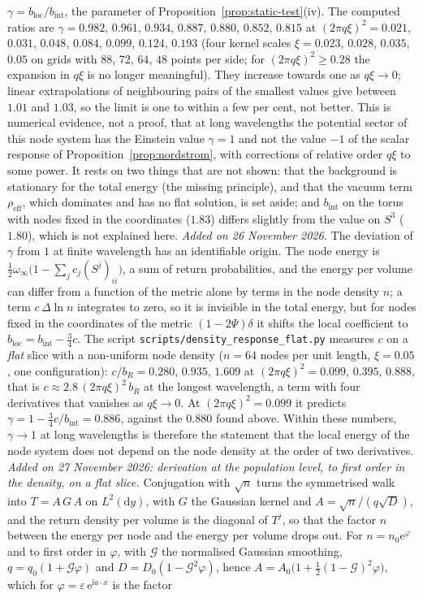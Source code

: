 \documentclass[11pt,a4paper]{article}
\theoremstyle{stmt}
\theoremstyle{defn}
\theoremstyle{rmk}
\numberwithin{equation}{section}
\newcommand{\dd}{\mathrm{d}}
\begin{document}
$\gamma=b_{\mathrm{loc}}/b_{\mathrm{int}}$, the parameter of Proposition~\ref{prop:static-test}(iv). The computed ratios are $\gamma=0.982$, $0.961$, $0.934$, $0.887$, $0.880$, $0.852$, $0.815$ at $(2\pi q\xi)^2=0.021$, $0.031$, $0.048$, $0.084$, $0.099$, $0.124$, $0.193$ (four kernel scales $\xi=0.023$, $0.028$, $0.035$, $0.05$ on grids with $88$, $72$, $64$, $48$ points per side; for $(2\pi q\xi)^2\ge0.28$ the expansion in $q\xi$ is no longer meaningful). They increase towards one as $q\xi\to0$; linear extrapolations of neighbouring pairs of the smallest values give between $1.01$ and $1.03$, so the limit is one to within a few per cent, not better. This is numerical evidence, not a proof, that at long wavelengths the potential sector of this node system has the Einstein value $\gamma=1$ and not the value $-1$ of the scalar response of Proposition~\ref{prop:nordstrom}, with corrections of relative order $q\xi$ to some power. It rests on two things that are not shown: that the background is stationary for the total energy (the missing principle), and that the vacuum term $\rho_{\mathrm{eff}}$, which dominates and has no flat solution, is set aside; and $b_{\mathrm{int}}$ on the torus with nodes fixed in the coordinates ($1.83$) differs slightly from the value on $S^3$ ($1.80$), which is not explained here. \emph{Added on 26 November 2026.} The deviation of $\gamma$ from $1$ at finite wavelength has an identifiable origin. The node energy is $\tfrac12\omega_\infty\big(1-\sum_jc_j(S^j)_{ii}\big)$, a sum of return probabilities, and the energy per volume can differ from a function of the metric alone by terms in the node density $n$; a term $c\,\Delta\ln n$ integrates to zero, so it is invisible in the total energy, but for nodes fixed in the coordinates of the metric $(1-2\Psi)\delta$ it shifts the local coefficient to $b_{\mathrm{loc}}=b_{\mathrm{int}}-\tfrac34c$. The script \texttt{scripts/density\_response\_flat.py} measures $c$ on a \emph{flat} slice with a non-uniform node density ($n=64$ nodes per unit length, $\xi=0.05$, one configuration): $c/b_R=0.280$, $0.935$, $1.609$ at $(2\pi q\xi)^2=0.099$, $0.395$, $0.888$, that is $c\approx2.8\,(2\pi q\xi)^2\,b_R$ at the longest wavelength, a term with four derivatives that vanishes as $q\xi\to0$. At $(2\pi q\xi)^2=0.099$ it predicts $\gamma=1-\tfrac34c/b_{\mathrm{int}}=0.886$, against the $0.880$ found above. Within these numbers, $\gamma\to1$ at long wavelengths is therefore the statement that the local energy of the node system does not depend on the node density at the order of two derivatives. \emph{Added on 27 November 2026: derivation at the population level, to first order in the density, on a flat slice.} Conjugation with $\sqrt n$ turns the symmetrised walk into $T=A\,G\,A$ on $L^2(\dd y)$, with $G$ the Gaussian kernel and $A=\sqrt n/(q\sqrt D)$, and the return density per volume is the diagonal of $T^j$, so that the factor $n$ between the energy per node and the energy per volume drops out. For $n=n_0\mathrm e^{\varphi}$ and to first order in $\varphi$, with $\mathcal G$ the normalised Gaussian smoothing, $q=q_0(1+\mathcal G\varphi)$ and $D=D_0(1-\mathcal G^2\varphi)$, hence $A=A_0\big(1+\tfrac12(1-\mathcal G)^2\varphi\big)$, which for $\varphi=\varepsilon\,\mathrm e^{\mathrm ia\cdot x}$ is the factor 
\end{document}
